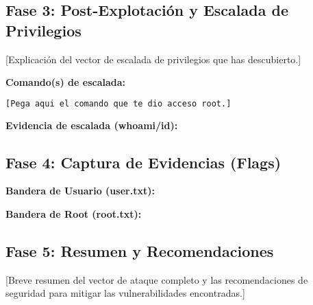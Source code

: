 \subsection{Fase 3: Post-Explotación y Escalada de Privilegios}
[Explicación del vector de escalada de privilegios que has descubierto.]

\textbf{Comando(s) de escalada:}
\begin{lstlisting}[language=bash]
[Pega aqui el comando que te dio acceso root.]
\end{lstlisting}

\textbf{Evidencia de escalada (whoami/id):}
%
%

\subsection{Fase 4: Captura de Evidencias (Flags)}
\textbf{Bandera de Usuario (user.txt):}
%
%

\textbf{Bandera de Root (root.txt):}
%
%

\subsection{Fase 5: Resumen y Recomendaciones}
[Breve resumen del vector de ataque completo y las recomendaciones de seguridad para mitigar las vulnerabilidades encontradas.]

\newpage